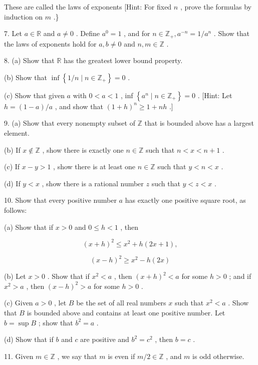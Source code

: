 These are called the laws of exponents [Hint: For fixed \(n\) , prove the formulas by induction on \(m\) .\}

7. Let \(a \in  \mathbb{R}\) and \(a \neq  0\) . Define \({a}^{0} = 1\) , and for \(n \in  {\mathbb{Z}}_{ + },{a}^{-n} = 1/{a}^{n}\) . Show that the laws of exponents hold for \(a,b \neq  0\) and \(n,m \in  \mathbb{Z}\) .

8. (a) Show that \(\mathbb{R}\) has the greatest lower bound property.

(b) Show that \(\inf \left\{  {1/n \mid  n \in  {\mathbb{Z}}_{ + }}\right\}   = 0\) .

(c) Show that given \(a\) with \(0 < a < 1\) , inf \(\left\{  {{a}^{n} \mid  n \in  {\mathbb{Z}}_{ + }}\right\}   = 0\) . [Hint: Let \(h = \left( {1 - a}\right) /a\) , and show that \({\left( 1 + h\right) }^{n} \geq  1 + {nh}\) .]

9. (a) Show that every nonempty subset of \(\mathbb{Z}\) that is bounded above has a largest element.

(b) If \(x \notin  \mathbb{Z}\) , show there is exactly one \(n \in  \mathbb{Z}\) such that \(n < x < n + 1\) .

(c) If \(x - y > 1\) , show there is at least one \(n \in  \mathbb{Z}\) such that \(y < n < x\) .

(d) If \(y < x\) , show there is a rational number \(z\) such that \(y < z < x\) .

10. Show that every positive number \(a\) has exactly one positive square root, as follows:

(a) Show that if \(x > 0\) and \(0 \leq  h < 1\) , then

\[
{\left( x + h\right) }^{2} \leq  {x}^{2} + h\left( {{2x} + 1}\right) ,
\]

\[
{\left( x - h\right) }^{2} \geq  {x}^{2} - h\left( {2x}\right)
\]

(b) Let \(x > 0\) . Show that if \({x}^{2} < a\) , then \({\left( x + h\right) }^{2} < a\) for some \(h > 0\) ; and if \({x}^{2} > a\) , then \({\left( x - h\right) }^{2} > a\) for some \(h > 0\) .

(c) Given \(a > 0\) , let \(B\) be the set of all real numbers \(x\) such that \({x}^{2} < a\) . Show that \(B\) is bounded above and contains at least one positive number. Let \(b = \sup B\) ; show that \({b}^{2} = a\) .

(d) Show that if \(b\) and \(c\) are positive and \({b}^{2} = {c}^{2}\) , then \(b = c\) .

11. Given \(m \in  \mathbb{Z}\) , we say that \(m\) is even if \(m/2 \in  \mathbb{Z}\) , and \(m\) is odd otherwise.

